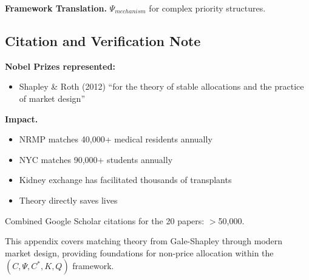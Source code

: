 \textbf{Framework Translation.}
$\Psi_{mechanism}$ for complex priority structures.

\subsection{Citation and Verification Note}

\textbf{Nobel Prizes represented:}
\begin{itemize}
    \item Shapley \& Roth (2012) ``for the theory of stable allocations and 
          the practice of market design''
\end{itemize}

\textbf{Impact.}
\begin{itemize}
    \item NRMP matches 40,000+ medical residents annually
    \item NYC matches 90,000+ students annually
    \item Kidney exchange has facilitated thousands of transplants
    \item Theory directly saves lives
\end{itemize}

Combined Google Scholar citations for the 20 papers: $>$50,000.

This appendix covers matching theory from Gale-Shapley through modern 
market design, providing foundations for non-price allocation within 
the $(C, \Psi, C^*, K, Q)$ framework.

